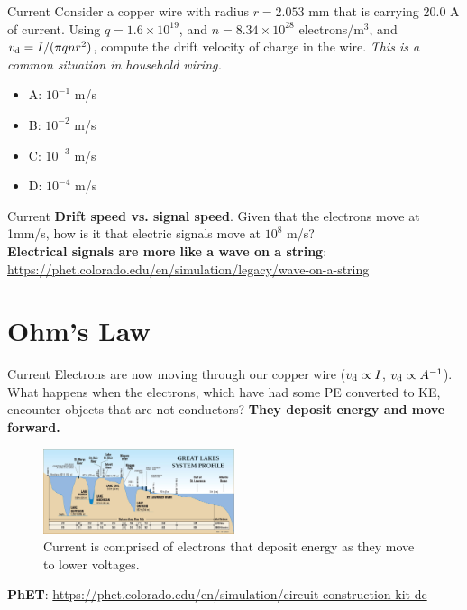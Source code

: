 \documentclass{beamer}
\begin{document}
\begin{frame}{Current}
Consider a copper wire with radius $r = 2.053$ mm that is carrying 20.0 A of current.  Using $q = 1.6\times 10^{19}$, and $n = 8.34 \times 10^{28}$ electrons/m$^3$, and $v_{\rm d} = I/(\pi q n r^2)$, compute the drift velocity of charge in the wire.  \textit{This is a common situation in household wiring.}
\begin{itemize}
\item A: $10^{-1}$ m/s
\item B: $10^{-2}$ m/s
\item C: $10^{-3}$ m/s
\item D: $10^{-4}$ m/s
\end{itemize}
\end{frame}

\begin{frame}{Current}
\textbf{Drift speed vs. signal speed}.  Given that the electrons move at 1mm/s, how is it that electric signals move at $10^8$ m/s? \\ \vspace{1cm}
\textbf{Electrical signals are more like a \alert{wave on a string}}: \\ \url{https://phet.colorado.edu/en/simulation/legacy/wave-on-a-string}
\end{frame}

\section{Ohm's Law}

\begin{frame}{Current}
\small
Electrons are now moving through our copper wire ($v_{\rm d} \propto I$, $v_{\rm d} \propto A^{-1}$).  What happens when the electrons, which have had some PE converted to KE, encounter objects that are not conductors?  \textbf{They deposit energy and move forward.} \\ \vspace{0.5cm}
\begin{figure}
\centering
\includegraphics[width=0.5\textwidth]{figures/lakes.jpg}
\caption{\label{fig:lakes} Current is comprised of electrons that deposit energy as they move to lower voltages.}
\end{figure}
\textbf{\alert{PhET}}: \url{https://phet.colorado.edu/en/simulation/circuit-construction-kit-dc}
\end{frame}
\end{document}
